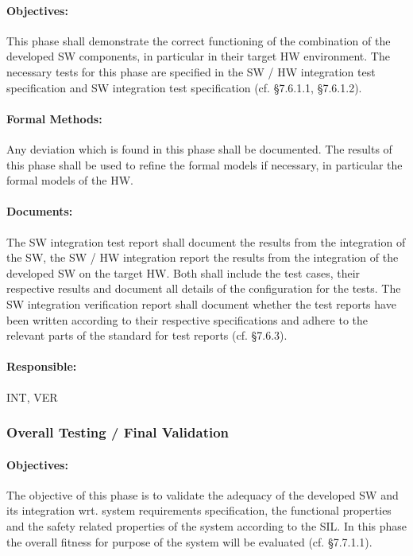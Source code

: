 \paragraph{Objectives:}
\label{sec:sw-int-objectives}
This phase shall demonstrate the correct functioning of the combination of the
developed SW components, in particular in their target HW environment. The
necessary tests for this phase are specified in the SW / HW integration test
specification and SW integration test specification (cf. §7.6.1.1, §7.6.1.2).

\paragraph{Formal Methods:}
\label{sec:sw-int-formal-methods}
Any deviation which is found in this phase shall be documented. The results of
this phase shall be used to refine the formal models if necessary, in particular
the formal models of the HW.

\paragraph{Documents:}
\label{sec:sw-int-documents}
The SW integration test report shall document the results from the integration
of the SW, the SW / HW integration report the results from the integration of
the developed SW on the target HW. Both shall include the test cases, their
respective results and document all details of the configuration for the
tests. The SW integration verification report shall document whether the test
reports have been written according to their respective specifications and
adhere to the relevant parts of the standard for test reports (cf. §7.6.3).

\paragraph{Responsible:}
\label{sec:sw-int-responsible}
INT, VER

\subsubsection{Overall Testing / Final Validation}
\label{sec:overall-testing-}

\paragraph{Objectives:}
\label{sec:sw-test-objectives}
The objective of this phase is to validate the adequacy of the developed SW and
its integration wrt. system requirements specification, the functional
properties and the safety related properties of the system according to the
SIL. In this phase the overall fitness for purpose of the system will be
evaluated (cf. §7.7.1.1).

